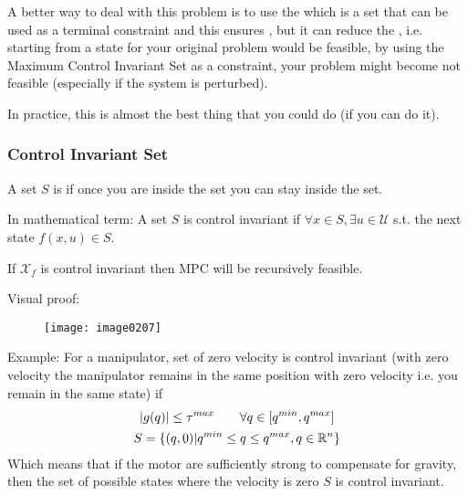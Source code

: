 A better way to deal with this problem is to use the  which is a set that can be used as a terminal constraint and this ensures , but it can reduce the , i.e. starting from a state for your original problem would be feasible, by using the Maximum Control Invariant Set as a constraint, your problem might become not feasible (especially if the system is perturbed).

In practice, this is almost the best thing that you could do (if you can do it).

\subsubsection{Control Invariant Set}
A set $S$ is  if once you are inside the set you can stay inside the set.

In mathematical term:
A set $S$ is control invariant if $\forall x \in S, \exists u\in \mathcal{U}$ s.t. the next state $f(x,u)\in S$.

\begin{theorem}
If $\mathcal{X}_f$ is control invariant then MPC will be recursively feasible.
\end{theorem}
Visual proof:
\begin{figure}[!h]
\centering
\texttt{[image: image0207]}
\end{figure}

Example:
For a manipulator, set of zero velocity is control invariant (with zero velocity the manipulator remains in the same position with zero velocity i.e. you remain in the same state) if 
\begin{gather*}
\lvert g(q)\rvert\le \tau^{max}\qquad\forall q \in[q^{min},q^{max}]\\
S=\{(q,0)|q^{min}\le q\le q^{max}, q\in\mathbb{R}^n\}
\end{gather*}
Which means that if the motor are sufficiently strong to compensate for gravity, then the set of possible states where the velocity is zero $S$ is control invariant.

